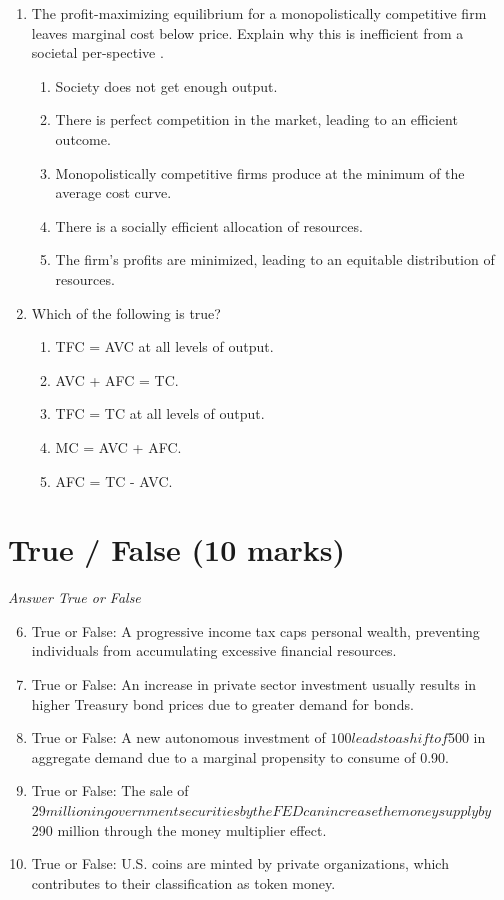 \documentclass[12pt]{article}
\begin{document}
\begin{enumerate}[label=\arabic*.]
\begin{enumerate}[label=(\alph*)]
    \item When the debt is negative the deficit decreases.
\end{enumerate}
\item The profit-maximizing equilibrium for a monopolistically competitive firm leaves marginal cost below price. Explain why this is inefficient from a societal per-spective .
\begin{enumerate}[label=(\alph*)]
    \item Society does not get enough output.
    \item There is perfect competition in the market, leading to an efficient outcome.
    \item Monopolistically competitive firms produce at the minimum of the average cost curve.
    \item There is a socially efficient allocation of resources.
    \item The firm's profits are minimized, leading to an equitable distribution of resources.
\end{enumerate}
\item Which of the following is true?
\begin{enumerate}[label=(\alph*)]
    \item TFC = AVC at all levels of output.
    \item AVC + AFC = TC.
    \item TFC = TC at all levels of output.
    \item MC = AVC + AFC.
    \item AFC = TC - AVC.
\end{enumerate}
\end{enumerate}

\section*{True / False (10 marks)}
\textit{Answer True or False}
\begin{enumerate}[label=\arabic*.]
\setcounter{enumi}{5}
\item True or False: A progressive income tax caps personal wealth, preventing individuals from accumulating excessive financial resources.
\item True or False: An increase in private sector investment usually results in higher Treasury bond prices due to greater demand for bonds.
\item True or False: A new autonomous investment of $100 leads to a shift of $500 in aggregate demand due to a marginal propensity to consume of 0.90.
\item True or False: The sale of $29 million in government securities by the FED can increase the money supply by $290 million through the money multiplier effect.
\item True or False: U.S. coins are minted by private organizations, which contributes to their classification as token money.
\end{enumerate}
\end{document}
